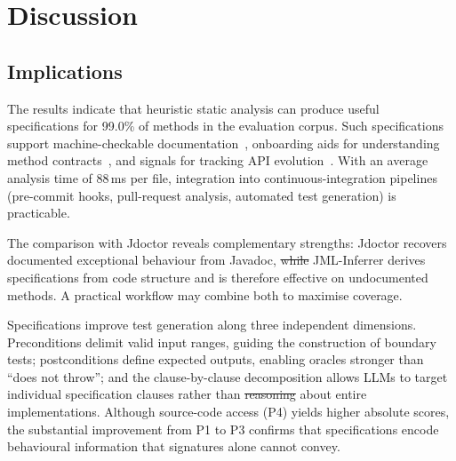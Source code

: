 \documentclass[11pt]{article}
\makeatletter
\providecommand{\DIFaddtex}[1]{{\protect\color{blue}\uwave{#1}}} %
\providecommand{\DIFdeltex}[1]{{\protect\color{red}\sout{#1}}} %
\providecommand{\DIFaddbegin}{} %
\providecommand{\DIFaddend}{} %
\providecommand{\DIFdelbegin}{} %
\providecommand{\DIFdelend}{} %
\providecommand{\DIFadd}[1]{\texorpdfstring{\DIFaddtex{#1}}{#1}} %
\providecommand{\DIFdel}[1]{\texorpdfstring{\DIFdeltex{#1}}{}} %
\providecommand{\DIFscaledelfig}{0.5}
\newlength{\DIFdelgraphicswidth} %
\newlength{\DIFdelgraphicsheight} %
\providecommand{\DIFaddincludegraphics}[2][]{{\color{blue}\fbox{\DIFOincludegraphics[#1]{#2}}}} %
\providecommand{\DIFdelincludegraphics}[2][]{%
\sbox{\DIFdelgraphicsbox}{\DIFOincludegraphics[#1]{#2}}%
\settoboxwidth{\DIFdelgraphicswidth}{\DIFdelgraphicsbox} %
\settoboxtotalheight{\DIFdelgraphicsheight}{\DIFdelgraphicsbox} %
\scalebox{\DIFscaledelfig}{%
\parbox[b]{\DIFdelgraphicswidth}{\usebox{\DIFdelgraphicsbox}\\[-\baselineskip] \rule{\DIFdelgraphicswidth}{0em}}\llap{\resizebox{\DIFdelgraphicswidth}{\DIFdelgraphicsheight}{%
\setlength{\unitlength}{\DIFdelgraphicswidth}%
\begin{picture}(1,1)%
\thicklines\linethickness{2pt} %
{\color[rgb]{1,0,0}\put(0,0){\framebox(1,1){}}}%
{\color[rgb]{1,0,0}\put(0,0){\line( 1,1){1}}}%
{\color[rgb]{1,0,0}\put(0,1){\line(1,-1){1}}}%
\end{picture}%
}\hspace*{3pt}}} %
} %
\DeclareRobustCommand{\DIFaddbegin}{\DIFOaddbegin \let\includegraphics\DIFaddincludegraphics} %
\DeclareRobustCommand{\DIFaddend}{\DIFOaddend \let\includegraphics\DIFOincludegraphics} %
\DeclareRobustCommand{\DIFdelbegin}{\DIFOdelbegin \let\includegraphics\DIFdelincludegraphics} %
\DeclareRobustCommand{\DIFdelend}{\DIFOaddend \let\includegraphics\DIFOincludegraphics} %
\let\sout@orig\sout %
\renewcommand{\sout}[1]{\ifmmode\text{\sout@orig{\ensuremath{#1}}}\else\sout@orig{#1}\fi} %
\makeatother
\begin{document}
\section{Discussion}
\label{sec:discussion}

\subsection{Implications}

The results indicate that heuristic static analysis can produce useful specifications for 99.0\% of methods in the evaluation corpus. Such specifications support machine-checkable documentation~\cite{peters1998using}, onboarding aids for understanding method contracts~\cite{sillito2008questions}, and signals for tracking API evolution~\cite{tip2002practical}. With an average analysis time of 88\,ms per file, integration into continuous-integration pipelines (pre-commit hooks, pull-request analysis, automated test generation) is practicable.

The comparison with Jdoctor reveals complementary strengths: Jdoctor recovers documented exceptional behaviour from Javadoc, \DIFdelbegin \DIFdel{while }\DIFdelend \DIFaddbegin \DIFadd{whereas }\DIFaddend JML-Inferrer derives specifications from code structure and is therefore effective on undocumented methods. A practical workflow may combine both to maximise coverage.

Specifications improve test generation along three independent dimensions. Preconditions delimit valid input ranges, guiding the construction of boundary tests; postconditions define expected outputs, enabling oracles stronger than ``does not throw''; and the clause-by-clause decomposition allows LLMs to target individual specification clauses rather than \DIFdelbegin \DIFdel{reasoning }\DIFdelend \DIFaddbegin \DIFadd{to reason }\DIFaddend about entire implementations. Although source-code access (P4) yields higher absolute scores, the substantial improvement from P1 to P3 confirms that specifications encode behavioural information that signatures alone cannot convey.
\end{document}
